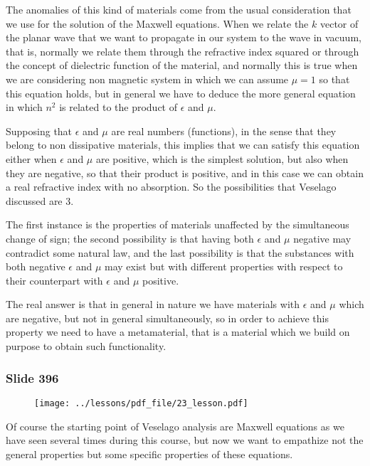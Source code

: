 \documentclass[../main/main.tex]{subfiles}
\begin{document}
The anomalies of this kind of materials come from the usual consideration that we use for the solution of the Maxwell equations. When we relate the $k$ vector of the planar wave that we want to propagate in our system to the wave in vacuum, that is, normally we relate them through the refractive index squared or through the concept of dielectric function of the material, and normally this is true when we are considering non magnetic system in which we can assume $\mu = 1$ so that this equation holds, but in general we have to deduce the more general equation in which $n^2$ is related to the product of $\epsilon$ and $\mu$. 

Supposing that $\epsilon$ and $\mu$ are real numbers (functions), in the sense that they belong to non dissipative materials, this implies that we can satisfy this equation either when $\epsilon$ and $\mu$ are positive, which is the simplest solution, but also when they are negative, so that their product is positive, and in this case we can obtain a real refractive index with no absorption. So the possibilities that Veselago discussed are 3. 

The first instance is the properties of materials unaffected by the simultaneous change of sign; the second possibility is that having both $\epsilon$ and $\mu$ negative may contradict some natural law, and the last possibility is that the substances with both negative $\epsilon$ and $\mu$ may exist but with different properties with respect to their counterpart with $\epsilon$ and $\mu$ positive. 

The real answer is that in general in nature we have materials with $\epsilon$ and $\mu$ which are negative, but not in general simultaneously, so in order to achieve this property we need to have a metamaterial, that is a material which we build on purpose to obtain such functionality. 

\newpage

\subsubsection{Slide 396}

\begin{figure}[h!]
\centering
\texttt{[image: ../lessons/pdf\_file/23\_lesson.pdf]}
\end{figure}

Of course the starting point of Veselago analysis are Maxwell equations as we have seen several times during this course, but now we want to empathize not the general properties but some specific properties of these equations.  
\end{document}
